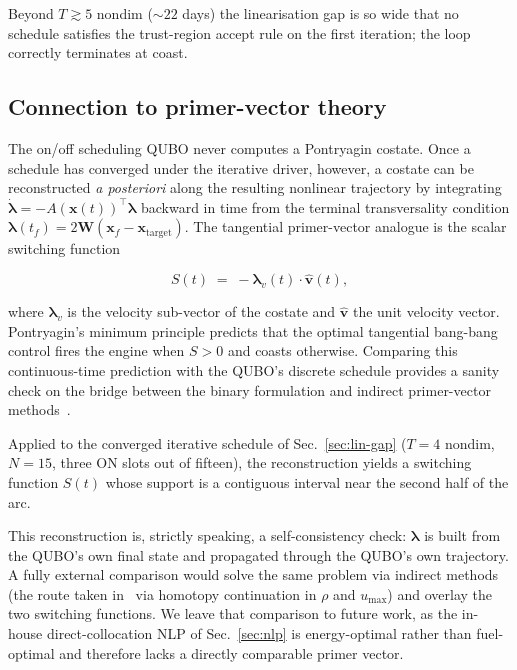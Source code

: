 \documentclass[11pt,a4paper]{article}
\theoremstyle{plain}
\newcommand{\bvec}[1]{\bm{#1}}
\newcommand{\xvec}{\bvec{x}}
\newcommand{\vvec}{\bvec{v}}
\newcommand{\Wmat}{\bvec{W}}
\begin{document}
Beyond $T \gtrsim 5$ nondim ($\sim 22$ days) the linearisation
gap is so wide that no schedule satisfies the trust-region accept
rule on the first iteration; the loop correctly terminates at
coast.

\subsection{Connection to primer-vector
  theory}\label{sec:primer-vector}

The on/off scheduling QUBO never computes a Pontryagin costate. Once a schedule has converged under the iterative driver,
however, a costate can be reconstructed \emph{a posteriori} along
the resulting nonlinear trajectory by integrating
\(\dot{\bvec{\lambda}} = -A(\xvec(t))^\top
\bvec{\lambda}\) backward in time from the terminal
transversality condition
\(\bvec{\lambda}(t_f) = 2\Wmat(\xvec_f - \xvec_\mathrm{target})\).
The tangential primer-vector analogue is the scalar switching
function

\begin{equation}
S(t) \;=\; -\bvec{\lambda}_v(t) \cdot \hat{\vvec}(t),
\label{eq:switching}
\end{equation}

where \(\bvec{\lambda}_v\) is the velocity sub-vector of the
costate and \(\hat{\vvec}\) the unit velocity vector. Pontryagin's
minimum principle predicts that the optimal tangential bang-bang
control fires the engine when \(S > 0\) and coasts otherwise.
Comparing this continuous-time prediction with the QUBO's discrete
schedule provides a sanity check on the bridge between the binary
formulation and indirect primer-vector
methods~\cite{Taylor2026}.

Applied to the converged iterative schedule of
Sec.~\ref{sec:lin-gap} ($T = 4$ nondim, $N = 15$, three ON
slots out of fifteen), the reconstruction yields a switching
function \(S(t)\) whose support is a contiguous interval near
the second half of the arc.

This reconstruction is, strictly speaking, a self-consistency
check: \(\bvec{\lambda}\) is built from the QUBO's own
final state and propagated through the QUBO's own trajectory.
A fully external comparison would solve the same problem via
indirect methods (the route taken in~\cite{Taylor2026} via
homotopy continuation in \(\rho\) and \(u_\mathrm{max}\)) and
overlay the two switching functions. We leave that comparison to
future work, as the in-house direct-collocation NLP of
Sec.~\ref{sec:nlp} is energy-optimal rather than fuel-optimal and
therefore lacks a directly comparable primer vector.
\end{document}
